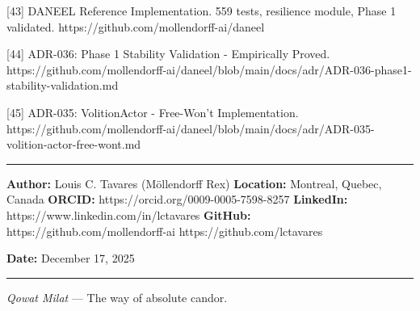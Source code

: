 \documentclass[
]{article}
\begin{document}
{[}43{]} DANEEL Reference Implementation. 559 tests, resilience module,
Phase 1 validated. https://github.com/mollendorff-ai/daneel

{[}44{]} ADR-036: Phase 1 Stability Validation - Empirically Proved.
https://github.com/mollendorff-ai/daneel/blob/main/docs/adr/ADR-036-phase1-stability-validation.md

{[}45{]} ADR-035: VolitionActor - Free-Won't Implementation.
https://github.com/mollendorff-ai/daneel/blob/main/docs/adr/ADR-035-volition-actor-free-wont.md

\begin{center}\rule{0.5\linewidth}{0.5pt}\end{center}

\textbf{Author:} Louis C. Tavares (Möllendorff Rex) \textbf{Location:}
Montreal, Quebec, Canada \textbf{ORCID:}
https://orcid.org/0009-0005-7598-8257 \textbf{LinkedIn:}
https://www.linkedin.com/in/lctavares \textbf{GitHub:}
https://github.com/mollendorff-ai \textbar{}
https://github.com/lctavares

\textbf{Date:} December 17, 2025

\begin{center}\rule{0.5\linewidth}{0.5pt}\end{center}

\emph{Qowat Milat} --- The way of absolute candor.
\end{document}
